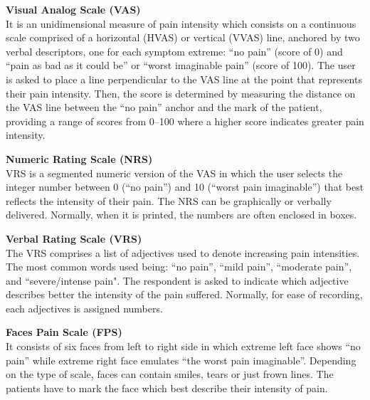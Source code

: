 \begin{description}
	
	\item{\textbf{Visual Analog Scale (VAS)}\hfill \\

It is an unidimensional measure of pain intensity which consists on a
	continuous scale comprised of a horizontal (HVAS) or vertical
	(VVAS) line, anchored by two verbal descriptors, one for each
	symptom extreme: ``no pain'' (score of 0) and ``pain as bad as
	it could be'' or ``worst imaginable pain'' (score of 100). The
	user is asked to place a line perpendicular to the VAS line at
	the point that represents their pain intensity. Then, the
	score is determined by measuring the distance on the VAS line
	between the ``no pain'' anchor and the mark of the patient,
	providing a range of scores from 0–100 where a higher score
	indicates greater pain intensity.  }

	\item{\textbf{Numeric Rating Scale (NRS)}\hfill \\

	VRS is a segmented numeric version of the VAS in which the
	user selects the integer number between 0 (``no pain'') and 10
	(``worst pain imaginable'') that best reflects the intensity
	of their pain. The NRS can be graphically or verbally
	delivered. Normally, when it is printed, the numbers are often
	enclosed in boxes.  }

        \item{\textbf{Verbal Rating Scale (VRS)}\hfill \\ 

        The VRS comprises a list of adjectives used to denote
	increasing pain intensities. The most common words used being:
	``no pain'', ``mild pain'', ``moderate pain'', and
	``severe/intense pain". The respondent is asked to indicate
	which adjective describes better the intensity of the pain
	suffered. Normally, for ease of recording, each adjectives is
	assigned numbers.  }

        \item{\textbf{Faces Pain Scale (FPS)}\hfill \\ 

        It consists of six faces from left to right side in which
	extreme left face shows ``no pain'' while extreme right face
	emulates ``the worst pain imaginable''. Depending on the type
	of scale, faces can contain smiles, tears or just frown
	lines. The patients have to mark the face which best describe
	their intensity of pain.  }

\end{description}

